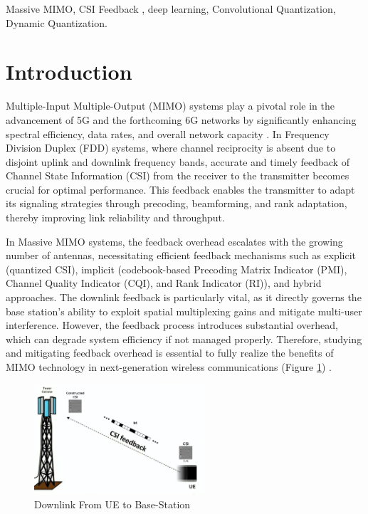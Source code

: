 \documentclass[lettersize,journal]{IEEEtran}
\begin{document}
\begin{IEEEkeywords}
Massive MIMO, CSI Feedback , deep learning, Convolutional Quantization,
Dynamic Quantization.
\end{IEEEkeywords}


\section{Introduction}
Multiple-Input Multiple-Output (MIMO) systems play a pivotal role in the advancement of 5G and the forthcoming 6G networks by significantly enhancing spectral efficiency, data rates, and overall network capacity \cite{abc}. In Frequency Division Duplex (FDD) systems, where channel reciprocity is absent due to disjoint uplink and downlink frequency bands, accurate and timely feedback of Channel State Information (CSI) from the receiver to the transmitter becomes crucial for optimal performance. This feedback enables the transmitter to adapt its signaling strategies through precoding, beamforming, and rank adaptation, thereby improving link reliability and throughput. 

In Massive MIMO systems, the feedback overhead escalates with the growing number of antennas, necessitating efficient feedback mechanisms such as explicit (quantized CSI), implicit (codebook-based Precoding Matrix Indicator (PMI), Channel Quality Indicator (CQI), and Rank Indicator (RI)), and hybrid approaches. The downlink feedback is particularly vital, as it directly governs the base station's ability to exploit spatial multiplexing gains and mitigate multi-user interference. However, the feedback process introduces substantial overhead, which can degrade system efficiency if not managed properly. Therefore, studying and mitigating feedback overhead is essential to fully realize the benefits of MIMO technology in next-generation wireless communications (Figure \ref{csifeedbackimage}) \cite{abd}.

\begin{figure}[!t]
	\centering
	\includegraphics[width=2.5in]{BTS_User_Equipement.pdf}
	\caption{Downlink From UE to Base-Station}
	\label{csifeedbackimage}
\end{figure}
\end{document}
